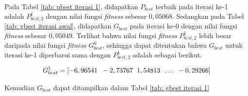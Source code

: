{{\begin{enumerate}[align = left, left = 0cm, nolistsep]
\begin{enumerate}[label = (\alph*), align = left, left = 0cm, nolistsep]
                        Pada Tabel \ref{tab: pbest iterasi 1}, didapatkan $P_{best}$ terbaik pada iterasi ke-1 adalah $P_{best,2}^{1}$ dengan nilai fungsi \textit{fitness} sebesar $0,05068$.
                        Sedangkan pada Tabel \ref{tab: gbest iterasi awal}, didapatkan $G_{best}$ pada iterasi ke-0 dengan nilai fungsi \textit{fitness} sebesar $0,05049$.
                        Terlihat bahwa nilai fungsi \textit{fitness} $P_{best,2}^{1}$ lebih besar daripada nilai fungsi \textit{fitness} $G_{best}^{0}$,
                        sehingga dapat ditentukan bahwa $G_{best}$ untuk iterasi ke-1 diperbarui sama dengan $P_{best,2}^{1}$ adalah sebagai berikut.

                        \begin{equation*}
                            G_{best}^{1} = [-6,96541\hspace{2mm}	-2,73767\hspace{2mm}	1,54813\hspace{2mm}  \dots\hspace{2mm} -0,29266                        ]
                        \end{equation*}

                        Kemudian $G_{best}$ dapat ditampilkan dalam Tabel \ref{tab: gbest iterasi 1}


\end{enumerate}
\end{enumerate}}}
